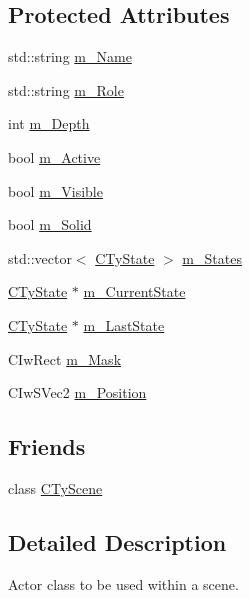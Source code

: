 \subsection*{Protected Attributes}
\begin{DoxyCompactItemize}
\item 
std::string \hyperlink{class_i_ty_actor_afdfb0e1ed5a47085f52f95f276010bb6}{m\_\-Name}
\item 
std::string \hyperlink{class_i_ty_actor_a92de9e18b7a31fc93b8bb775922078d4}{m\_\-Role}
\item 
int \hyperlink{class_i_ty_actor_ac075325d62fdcda89c2a91f2c1298376}{m\_\-Depth}
\item 
bool \hyperlink{class_i_ty_actor_ae460cd48bef240e11cfa5df7a505cbe9}{m\_\-Active}
\item 
bool \hyperlink{class_i_ty_actor_a1019d46cd7502694e5f69c7c4c7be23e}{m\_\-Visible}
\item 
bool \hyperlink{class_i_ty_actor_a0365728019201a011e657ab56e36d06a}{m\_\-Solid}
\item 
std::vector$<$ \hyperlink{class_i_ty_actor_1_1_c_ty_state}{CTyState} $>$ \hyperlink{class_i_ty_actor_aa90c7ebf0af50802126ca951906fb225}{m\_\-States}
\item 
\hyperlink{class_i_ty_actor_1_1_c_ty_state}{CTyState} $\ast$ \hyperlink{class_i_ty_actor_afcdb5a06ae0e2b6d9872fa6f17222487}{m\_\-CurrentState}
\item 
\hyperlink{class_i_ty_actor_1_1_c_ty_state}{CTyState} $\ast$ \hyperlink{class_i_ty_actor_ab637fbe1df811cbde3ad2b780f1ea643}{m\_\-LastState}
\item 
CIwRect \hyperlink{class_i_ty_actor_abd0ddacb8e677d2d36ead794883dee4c}{m\_\-Mask}
\item 
CIwSVec2 \hyperlink{class_i_ty_actor_a296ffe4ccf5fad06daf002837b9ec128}{m\_\-Position}
\end{DoxyCompactItemize}
\subsection*{Friends}
\begin{DoxyCompactItemize}
\item 
class \hyperlink{class_i_ty_actor_ac9e603148a462b197c336bd2dedd9f87}{CTyScene}
\end{DoxyCompactItemize}


\subsection{Detailed Description}
Actor class to be used within a scene. 

